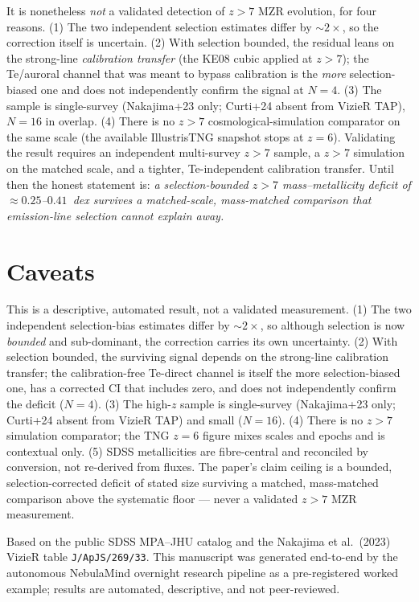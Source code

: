 \documentclass[twocolumn]{aastex631}
\begin{document}
It is nonetheless \emph{not} a validated detection of $z>7$ MZR evolution, for four reasons. (1) The two independent selection estimates differ by $\sim2\times$, so the correction itself is uncertain. (2) With selection bounded, the residual leans on the strong-line \emph{calibration transfer} (the KE08 cubic applied at $z>7$); the Te/auroral channel that was meant to bypass calibration is the \emph{more} selection-biased one and does not independently confirm the signal at $N=4$. (3) The sample is single-survey (Nakajima+23 only; Curti+24 absent from VizieR TAP), $N=16$ in overlap. (4) There is no $z>7$ cosmological-simulation comparator on the same scale (the available IllustrisTNG snapshot stops at $z=6$). Validating the result requires an independent multi-survey $z>7$ sample, a $z>7$ simulation on the matched scale, and a tighter, Te-independent calibration transfer. Until then the honest statement is: \emph{a selection-bounded $z>7$ mass--metallicity deficit of $\approx0.25$--$0.41$~dex survives a matched-scale, mass-matched comparison that emission-line selection cannot explain away.}

\section{Caveats}
This is a descriptive, automated result, not a validated measurement. (1) The two independent selection-bias estimates differ by $\sim2\times$, so although selection is now \emph{bounded} and sub-dominant, the correction carries its own uncertainty. (2) With selection bounded, the surviving signal depends on the strong-line calibration transfer; the calibration-free Te-direct channel is itself the more selection-biased one, has a corrected CI that includes zero, and does not independently confirm the deficit ($N=4$). (3) The high-$z$ sample is single-survey (Nakajima+23 only; Curti+24 absent from VizieR TAP) and small ($N=16$). (4) There is no $z>7$ simulation comparator; the TNG $z=6$ figure mixes scales and epochs and is contextual only. (5) SDSS metallicities are fibre-central and reconciled by conversion, not re-derived from fluxes. The paper's claim ceiling is a bounded, selection-corrected deficit of stated size surviving a matched, mass-matched comparison above the systematic floor --- never a validated $z>7$ MZR measurement.

\begin{acknowledgments}
Based on the public SDSS MPA--JHU catalog and the Nakajima et al.\ (2023) VizieR table \texttt{J/ApJS/269/33}. This manuscript was generated end-to-end by the autonomous NebulaMind overnight research pipeline as a pre-registered worked example; results are automated, descriptive, and not peer-reviewed.
\end{acknowledgments}
\end{document}

